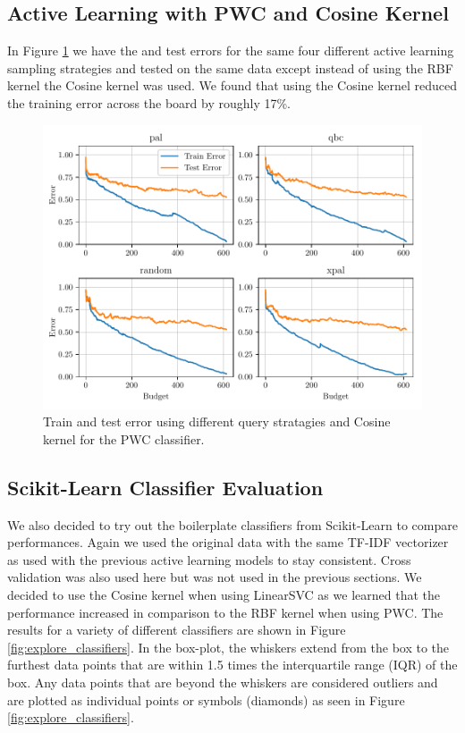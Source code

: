 \subsection{Active Learning with PWC and Cosine Kernel}

In Figure \ref{fig:plot_all_results_cosine} we have the and test errors for the same four different active learning sampling strategies and tested on the same data except instead of using the RBF kernel the Cosine kernel was used. We found that using the Cosine kernel reduced the training error across the board by roughly 17\%.  

\begin{figure}[ht]
  \centering
  \includegraphics[width=\textwidth]{../img/plot_all_results_cosine.pdf}
  \caption{Train and test error using different query stratagies and Cosine kernel for the PWC classifier.}
  \label{fig:plot_all_results_cosine}
\end{figure}

\subsection{Scikit-Learn Classifier Evaluation}

We also decided to try out the boilerplate classifiers from Scikit-Learn to compare performances. Again we used the original data with the same TF-IDF vectorizer as used with the previous active learning models to stay consistent. Cross validation was also used here but was not used in the previous sections. We decided to use the Cosine kernel when using LinearSVC as we learned that the performance increased in comparison to the RBF kernel when using PWC. The results for a variety of different classifiers are shown in Figure \ref{fig:explore_classifiers}. In the box-plot, the whiskers extend from the box to the furthest data points that are within 1.5 times the interquartile range (IQR) of the box. Any data points that are beyond the whiskers are considered outliers and are plotted as individual points or symbols (diamonds) as seen in Figure \ref{fig:explore_classifiers}.

